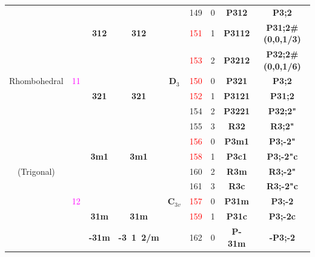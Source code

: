 \documentclass{article}      %
\begin{document}
\begin{small}
\begin{longtable}[c]{|c|c|c|c|c|c|c|c|c|}
          &  & & & &\textrm{149}  &\textrm{0} &\textbf{P312}         &\textbf{P3;2}\\\cline{6-9}         
	  &  &\textbf{312} &\textbf{312} & &\textrm{\textcolor{red}{151}}  &\textrm{1} &\textbf{P3112}       &\textbf{P31;2#(0,0,1/3)}\\\cline{6-9}  
	  &  & & & &\textrm{\textcolor{red}{153}} & \textrm{2} &\textbf{P3212}       &\textbf{P32;2#(0,0,1/6)}\\\cline{3-4}\cline{6-9}  
\textrm{Rhombohedral}  & \textrm{\textcolor{magenta}{11}} & & &$\mathbf{D}_3$ &\textrm{\textcolor{red}{150}}  &\textrm{0} &\textbf{P321} &\textbf{P3;2}\\\cline{6-9}        
	  &  &\textbf{321} &\textbf{321} & &\textrm{\textcolor{red}{152}}  &\textrm{1} &\textbf{P3121}         &\textbf{P31;2}\\\cline{6-9}        
          &  & & & &\textrm{154}  &\textrm{2} &\textbf{P3221}       &\textbf{P32;2"}\\\cline{6-9}        
          &  & & & &\textrm{155} &\textrm{3} &\textbf{R32}         &\textbf{R3;2"}\\\cline{2-9}         
	  & & & & &\textrm{\textcolor{red}{156}} &\textrm{0} &\textbf{P3m1}         &\textbf{P3;-2"}\\\cline{6-9}       
&  &\textbf{3m1} &\textbf{3m1} & &\textrm{\textcolor{red}{158}} &\textrm{1} &\textbf{P3c1}         &\textbf{P3;-2"c}\\\cline{6-9}      
 \textrm{(Trigonal)} & & & & &\textrm{160} &\textrm{2} &\textbf{R3m}         &\textbf{R3;-2"}\\\cline{6-9}        
 &  & & & &\textrm{161} &\textrm{3} &\textbf{R3c}         &\textbf{R3;-2"c}\\\cline{3-4}\cline{6-9}       
& \textrm{\textcolor{magenta}{12}}  & & &$\mathbf{C}_{3v}$ &\textrm{\textcolor{red}{157}} &\textrm{0} &\textbf{P31m} &\textbf{P3;-2}\\\cline{6-9}        
&  &\textbf{31m} &\textbf{31m} & &\textrm{\textcolor{red}{159}} &\textrm{1} &\textbf{P31c}         &\textbf{P3;-2c}\\\cline{2-9}       
 & &\textbf{-31m} &\textbf{-3~1~2/m}  & &\textrm{162}  &\textrm{0} &\textbf{P-31m}       &\textbf{-P3;-2}\\\cline{6-9}        

\end{longtable}
\end{small}
\end{document}
